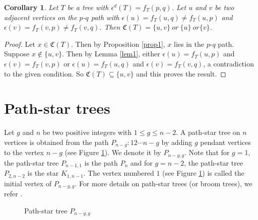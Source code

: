\documentclass[11pt]{article}
\newtheorem{corollary}[theorem]{Corollary}
\begin{document}
\begin{corollary}\label{cor2}
Let $T$ be a tree with $\epsilon^d(T)= f_T(p,q)$. Let $u$ and $v$ be two adjacent vertices on the $p$-$q$ path with $\epsilon(u)=f_T(u ,q)\neq f_T(u ,p) $ and $\epsilon(v)=f_T(v,p)\neq f_T(v,q)$. Then $\mathfrak{C}(T)=\{u,v\}\ or\ \{u\}\ or \{v\}$.
\end{corollary}
\begin{proof}
Let $x\in \mathfrak{C}(T)$. Then by Proposition \ref{prop1}, $x$ lies in the $p$-$q$ path. Suppose $x\notin \{u,v\}$. Then by Lemma \ref{lem1}, either $\epsilon(u)=f_T(u ,p)$ and $\epsilon(v)=f_T(v,p)$ or $\epsilon(u)=f_T(u ,q)$ and $\epsilon(v)=f_T(v,q)$, a contradiction to the given condition. So $\mathfrak{C}(T)\subseteq \{u,v\}$ and this proves the result.
\end{proof}

\section{Path-star trees}\label{pst}

Let $g$ and $n$ be two positive integers with $1\leq g\leq n-2$. A path-star tree on $n$ vertices is obtained from the  path $P_{n-g}:12\cdots n-g$ by adding $g$ pendant vertices to the vertex $n-g$ (see Figure \ref{fig3}). We denote it by $P_{n-g,g}$. Note that for $g=1$, the path-star tree $P_{n-1,1}$ is the path $P_n$ and for $g=n-2$, the path-star tree $P_{2,n-2}$ is the star $K_{1,n-1}$. The vertex numbered $1$ (see Figure \ref{fig3}) is called the initial vertex of $P_{n-g,g}$. For more details on path-star trees (or broom trees), we refer \cite{Na, Des, Klp}.

\begin{figure}[h]
    \centering
\caption{Path-star tree $P_{n-g,g}$}\label{fig3}
\end{figure}
\end{document}
